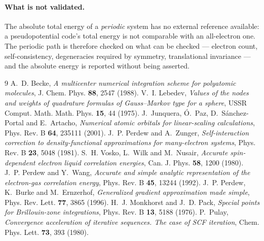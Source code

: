 \documentclass[11pt,a4paper]{article}
\begin{document}
\paragraph{What is not validated.} The absolute total energy of a
\emph{periodic} system has no external reference available: a pseudopotential
code's total energy is not comparable with an all-electron one. The periodic
path is therefore checked on what can be checked --- electron count,
self-consistency, degeneracies required by symmetry, translational invariance
--- and the absolute energy is reported without being asserted.

\begin{thebibliography}{9}
\small
{} A.~D. Becke,
  \emph{A multicenter numerical integration scheme for polyatomic molecules},
  J. Chem. Phys. \textbf{88}, 2547 (1988).
 V.~I. Lebedev,
  \emph{Values of the nodes and weights of quadrature formulas of
  Gauss--Markov type for a sphere},
  USSR Comput. Math. Math. Phys. \textbf{15}, 44 (1975).
 J.~Junquera, \'O.~Paz, D.~S\'anchez-Portal and E.~Artacho,
  \emph{Numerical atomic orbitals for linear-scaling calculations},
  Phys. Rev. B \textbf{64}, 235111 (2001).
 J.~P. Perdew and A.~Zunger,
  \emph{Self-interaction correction to density-functional approximations
  for many-electron systems},
  Phys. Rev. B \textbf{23}, 5048 (1981).
 S.~H. Vosko, L.~Wilk and M.~Nusair,
  \emph{Accurate spin-dependent electron liquid correlation energies},
  Can. J. Phys. \textbf{58}, 1200 (1980).
 J.~P. Perdew and Y.~Wang,
  \emph{Accurate and simple analytic representation of the electron-gas
  correlation energy},
  Phys. Rev. B \textbf{45}, 13244 (1992).
 J.~P. Perdew, K.~Burke and M.~Ernzerhof,
  \emph{Generalized gradient approximation made simple},
  Phys. Rev. Lett. \textbf{77}, 3865 (1996).
 H.~J. Monkhorst and J.~D. Pack,
  \emph{Special points for Brillouin-zone integrations},
  Phys. Rev. B \textbf{13}, 5188 (1976).
 P.~Pulay,
  \emph{Convergence acceleration of iterative sequences. The case of SCF
  iteration},
  Chem. Phys. Lett. \textbf{73}, 393 (1980).
\end{thebibliography}
\end{document}
